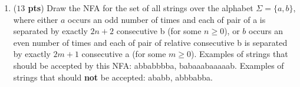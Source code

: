 \documentclass[10pt]{article}
\newcommand {\pts}[1]{({\bf #1 pts})}
\begin{document}
\begin{enumerate}
\begin{enumerate}
\begin{tikzpicture}[shorten >=1pt,node distance=2.6cm,on grid,auto]
                
                
    \end{tikzpicture}
  \end{enumerate}

   \newpage
  \item \pts{$13$}  Draw the NFA for the set of all strings over the alphabet $\Sigma = \{a,b\}$, where either $a$ occurs
  an odd number of times and each of pair of a is separated by exactly $2n+2$ consecutive b (for some $n \geq 0$), or $b$ occurs
  an even number of times and each of pair of relative consecutive b is separated by exactly $2m+1$ consecutive a (for some $m \geq 0$).
  Examples of strings that should be accepted by this NFA: abbabbbba, babaaabaaaaab.
  Examples of strings that should \textbf{not} be accepted: ababb, abbbabba.
    \\
    \\
    \begin{tikzpicture}[shorten >=1pt,node distance=2cm,on grid,auto]
 

\end{tikzpicture}
\end{enumerate}
\end{document}
